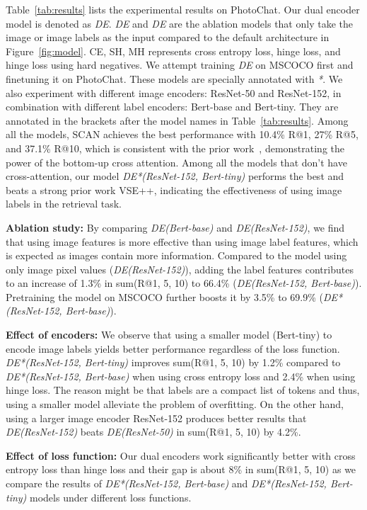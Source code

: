 \documentclass[11pt,a4paper]{article}
\begin{document}
Table~\ref{tab:results} lists the experimental results on PhotoChat. Our dual encoder model is denoted as \textit{DE}. \textit{DE} and \textit{DE} are the ablation models that only take the image  or image labels  as the input compared to the default architecture in Figure~\ref{fig:model}. 
CE, SH, MH represents cross entropy loss, hinge loss, and hinge loss using hard negatives. We attempt training \textit{DE} on MSCOCO first and finetuning it on PhotoChat. These models are specially annotated with \textit{*}. We also experiment with different image encoders: ResNet-50 and ResNet-152, in combination with different label encoders: Bert-base and Bert-tiny. They are annotated in the brackets after the model names in Table~\ref{tab:results}. 
Among all the models, SCAN achieves the best performance with 10.4\% R@1, 27\% R@5, and 37.1\% R@10, which is consistent with the prior work~\citep{lee2018stacked}, demonstrating the power of the bottom-up cross attention. Among all the models that don't have cross-attention, our model \textit{DE*(ResNet-152, Bert-tiny)} performs the best and beats a strong prior work VSE++, indicating the effectiveness of using image labels in the retrieval task.

\textbf{Ablation study:} By comparing \textit{DE(Bert-base)} and \textit{\textit{DE(ResNet-152)}}, we find that using image features is more effective than using image label features, which is expected as images contain more information. Compared to the model using only image pixel values (\textit{DE(ResNet-152)}), adding the label features contributes to an increase of 1.3\% in sum(R@1, 5, 10) to 66.4\% (\textit{DE(ResNet-152, Bert-base)}). Pretraining the model on MSCOCO further boosts it by 3.5\% to 69.9\% (\textit{DE*(ResNet-152, Bert-base)}).

\textbf{Effect of encoders:} We observe that using a smaller model (Bert-tiny) to encode image labels yields better performance regardless of the loss function. \textit{DE*(ResNet-152, Bert-tiny)} improves sum(R@1, 5, 10) by 1.2\% compared to \textit{DE*(ResNet-152, Bert-base)} when using cross entropy loss and 2.4\% when using hinge loss. The reason might be that labels are a compact list of tokens and thus, using a smaller model alleviate the problem of overfitting. On the other hand, using a larger image encoder ResNet-152 produces better results that \textit{DE(ResNet-152)} beats \textit{DE(ResNet-50)} in sum(R@1, 5, 10) by 4.2\%.

\textbf{Effect of loss function:} Our dual encoders work significantly better with cross entropy loss than hinge loss and their gap is about 8\% in sum(R@1, 5, 10) as we compare the results of \textit{DE*(ResNet-152, Bert-base)} and \textit{DE*(ResNet-152, Bert-tiny)} models under different loss functions.
\end{document}
